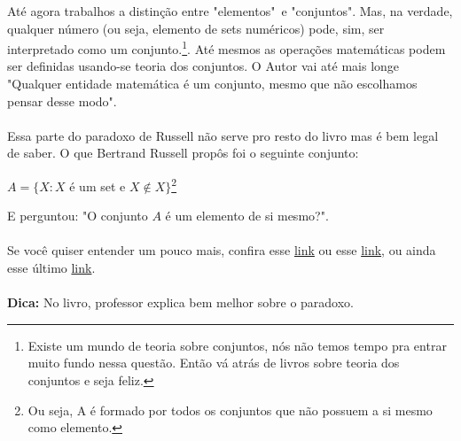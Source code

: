 \documentclass[main.tex]{subfiles}
\begin{document}
Até agora trabalhos a distinção entre "elementos"\ e "conjuntos". Mas, na verdade, qualquer número (ou seja, elemento de sets numéricos) pode, sim, ser interpretado como um conjunto.\footnote{Existe um mundo de teoria sobre conjuntos, nós não temos tempo pra entrar muito fundo nessa questão. Então vá atrás de livros sobre teoria dos conjuntos e seja feliz.}. Até mesmos as operações matemáticas podem ser definidas usando-se teoria dos conjuntos. O Autor vai até mais longe "Qualquer entidade matemática é um conjunto, mesmo que não escolhamos pensar desse modo".
\\~\\
Essa parte do paradoxo de Russell não serve pro resto do livro mas é bem legal de saber. O que Bertrand Russell propôs foi o seguinte conjunto:
\begin{center}
	$ A = \{ X : X $ é um set e $X \notin X \}$\footnote{Ou seja, A é formado por todos os conjuntos que não possuem a si mesmo como elemento.}
\end{center}
E perguntou: "O conjunto $A$ é um elemento de si mesmo?".
\\~\\
Se você quiser entender um pouco mais, confira esse \href{https://www.youtube.com/watch?v=AQTTYAM8BF0}{link} ou esse \href{https://www.youtube.com/watch?v=0Bs0lJRxOaI}{link}, ou ainda esse último \href{https://www.youtube.com/watch?v=HeQX2HjkcNo}{link}.
\\~\\
\textbf{Dica:} No livro, professor explica bem melhor sobre o paradoxo.
\end{document}
